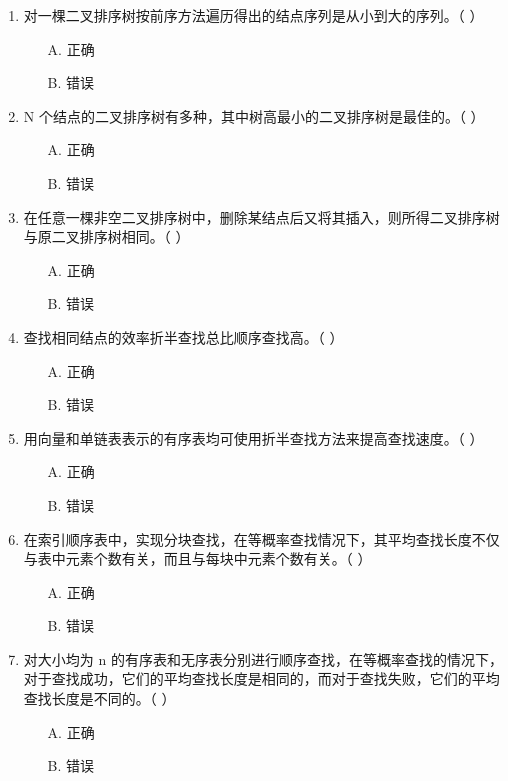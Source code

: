 \documentclass[12pt, a4paper]{article}
\begin{document}
\begin{enumerate}[label=\arabic*.]
	\item 对一棵二叉排序树按前序方法遍历得出的结点序列是从小到大的序列。（ ）
	      \begin{enumerate}
		      \item[A.] 正确
		      \item[B.] 错误
	      \end{enumerate}

	\item N 个结点的二叉排序树有多种，其中树高最小的二叉排序树是最佳的。（ ）
	      \begin{enumerate}
		      \item[A.] 正确
		      \item[B.] 错误
	      \end{enumerate}

	\item 在任意一棵非空二叉排序树中，删除某结点后又将其插入，则所得二叉排序树与原二叉排序树相同。（ ）
	      \begin{enumerate}
		      \item[A.] 正确
		      \item[B.] 错误
	      \end{enumerate}

	\item 查找相同结点的效率折半查找总比顺序查找高。（ ）
	      \begin{enumerate}
		      \item[A.] 正确
		      \item[B.] 错误
	      \end{enumerate}

	\item 用向量和单链表表示的有序表均可使用折半查找方法来提高查找速度。（ ）
	      \begin{enumerate}
		      \item[A.] 正确
		      \item[B.] 错误
	      \end{enumerate}

	\item 在索引顺序表中，实现分块查找，在等概率查找情况下，其平均查找长度不仅与表中元素个数有关，而且与每块中元素个数有关。（ ）
	      \begin{enumerate}
		      \item[A.] 正确
		      \item[B.] 错误
	      \end{enumerate}

	\item 对大小均为 n 的有序表和无序表分别进行顺序查找，在等概率查找的情况下，对于查找成功，它们的平均查找长度是相同的，而对于查找失败，它们的平均查找长度是不同的。（ ）
	      \begin{enumerate}
		      \item[A.] 正确
		      \item[B.] 错误
	      \end{enumerate}


\end{enumerate}
\end{document}
